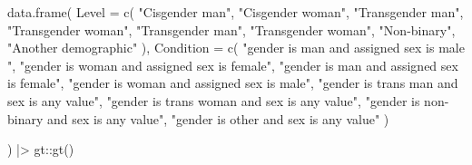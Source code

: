 \documentclass[
  letterpaper,
  DIV=11,
  numbers=noendperiod,
  oneside]{scrreprt}
\newenvironment{Shaded}{\begin{snugshade}}{\end{snugshade}}
\newcommand{\AttributeTok}[1]{\textcolor[rgb]{0.40,0.45,0.13}{#1}}
\newcommand{\FunctionTok}[1]{\textcolor[rgb]{0.28,0.35,0.67}{#1}}
\newcommand{\NormalTok}[1]{\textcolor[rgb]{0.00,0.23,0.31}{#1}}
\newcommand{\SpecialCharTok}[1]{\textcolor[rgb]{0.37,0.37,0.37}{#1}}
\newcommand{\StringTok}[1]{\textcolor[rgb]{0.13,0.47,0.30}{#1}}
\begin{document}
\begin{Shaded}
\begin{Highlighting}[]
\FunctionTok{data.frame}\NormalTok{(}
  \AttributeTok{Level =} \FunctionTok{c}\NormalTok{(}
              \StringTok{"Cisgender man"}\NormalTok{, }
              \StringTok{"Cisgender woman"}\NormalTok{,}
              \StringTok{"Transgender man"}\NormalTok{,}
              \StringTok{"Transgender woman"}\NormalTok{,}
              \StringTok{"Transgender man"}\NormalTok{,}
              \StringTok{"Transgender woman"}\NormalTok{,}
              \StringTok{"Non{-}binary"}\NormalTok{,}
              \StringTok{"Another demographic"}
\NormalTok{              ),}
  \AttributeTok{Condition =} \FunctionTok{c}\NormalTok{(}
                \StringTok{"gender is \textquotesingle{}man\textquotesingle{} and assigned sex is \textquotesingle{}male\textquotesingle{} "}\NormalTok{, }
                \StringTok{"gender is \textquotesingle{}woman\textquotesingle{} and assigned sex is \textquotesingle{}female\textquotesingle{}"}\NormalTok{,}
                \StringTok{"gender is \textquotesingle{}man\textquotesingle{} and assigned sex is \textquotesingle{}female\textquotesingle{}"}\NormalTok{,}
                \StringTok{"gender is \textquotesingle{}woman\textquotesingle{} and assigned sex is \textquotesingle{}male\textquotesingle{}"}\NormalTok{,}
                \StringTok{"gender is \textquotesingle{}trans man\textquotesingle{} and sex is any value"}\NormalTok{,}
                \StringTok{"gender is \textquotesingle{}trans woman\textquotesingle{} and sex is any value"}\NormalTok{,}
                \StringTok{"gender is \textquotesingle{}non{-}binary\textquotesingle{} and sex is any value"}\NormalTok{,}
                \StringTok{"gender is \textquotesingle{}other\textquotesingle{} and sex is any value"}
\NormalTok{                )}
             
\NormalTok{) }\SpecialCharTok{|\textgreater{}}
\NormalTok{  gt}\SpecialCharTok{::}\FunctionTok{gt}\NormalTok{()}
\end{Highlighting}
\end{Shaded}
\end{document}
